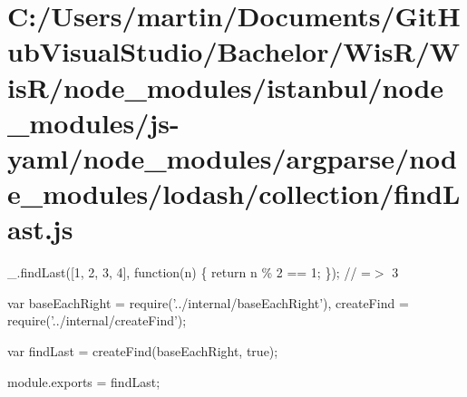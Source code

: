 \hypertarget{_c_1_2_users_2martin_2_documents_2_git_hub_visual_studio_2_bachelor_2_wis_r_2_wis_r_2node_module76adbbb8614df4c8c57117419608d3f1}{}\section{C\+:/\+Users/martin/\+Documents/\+Git\+Hub\+Visual\+Studio/\+Bachelor/\+Wis\+R/\+Wis\+R/node\+\_\+modules/istanbul/node\+\_\+modules/js-\/yaml/node\+\_\+modules/argparse/node\+\_\+modules/lodash/collection/find\+Last.\+js}
\+\_\+.\+find\+Last(\mbox{[}1, 2, 3, 4\mbox{]}, function(n) \{ return n \% 2 == 1; \}); // =$>$ 3


\begin{DoxyCodeInclude}
var baseEachRight = require(\textcolor{stringliteral}{'../internal/baseEachRight'}),
    createFind = require(\textcolor{stringliteral}{'../internal/createFind'});

var findLast = createFind(baseEachRight, \textcolor{keyword}{true});

module.exports = findLast;
\end{DoxyCodeInclude}
 
